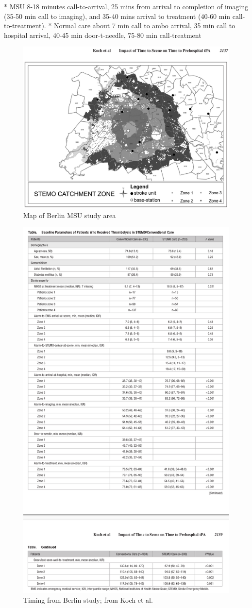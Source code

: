 * MSU 8-18 minutes call-to-arrival, 25 mins from arrival to completion of imaging (35-50 min call to imaging), and 35-40 mins arrival to treatment (40-60 min call-to-treatment).
* Normal care about 7 min call to ambo arrival, 35 min call to hospital arrival, 40-45 min door-t-needle, 75-80 min call-treatment


\begin{figure}
    \centering
    \includegraphics[width=0.9\linewidth]{images_background/berlin_map_2.png}
    \caption{Map of Berlin MSU study area }
    \label{fig:map_berlin_2}
\end{figure}

\begin{figure}
    \centering
    \includegraphics[width=0.5\linewidth]{images_background/koch_timings.png}
    \caption{Timing from Berlin study; from Koch et al.}
    \label{fig:kock_timings}
\end{figure}

